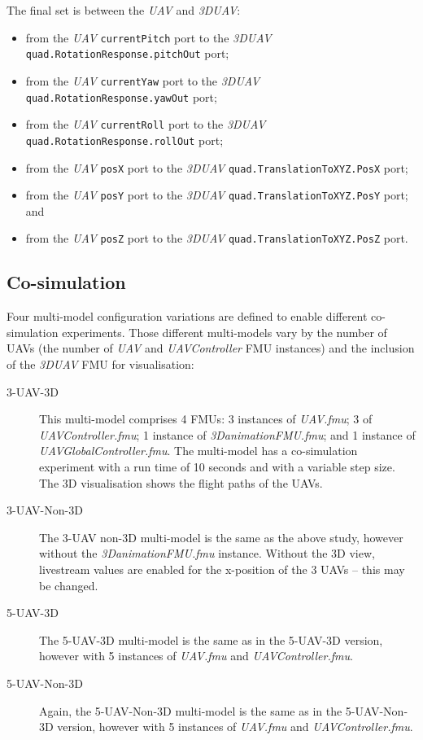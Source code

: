 The final set is between the \emph{UAV} and \emph{3DUAV}:
 \begin{itemize}
  \item from the \emph{UAV} \texttt{currentPitch} port to the \emph{3DUAV} \texttt{quad.RotationResponse.pitchOut} port;
  \item from the \emph{UAV} \texttt{currentYaw} port to the \emph{3DUAV} \texttt{quad.RotationResponse.yawOut} port;
  \item from the \emph{UAV} \texttt{currentRoll} port to the \emph{3DUAV} \texttt{quad.RotationResponse.rollOut} port;
  \item from the \emph{UAV} \texttt{posX} port to the \emph{3DUAV} \texttt{quad.TranslationToXYZ.PosX} port;
  \item from the \emph{UAV} \texttt{posY} port to the \emph{3DUAV} \texttt{quad.TranslationToXYZ.PosY} port; and 
  \item from the \emph{UAV} \texttt{posZ} port to the \emph{3DUAV} \texttt{quad.TranslationToXYZ.PosZ} port.
\end{itemize}


\subsection{Co-simulation}
\label{sec:uavswarm_into_co}

Four multi-model configuration variations are defined to enable different co-simulation experiments. Those different multi-models vary by the number of UAVs (the number of \emph{UAV} and \emph{UAVController} FMU instances) and the inclusion of the \emph{3DUAV} FMU for visualisation:

\begin{description}
  \item[3-UAV-3D] This multi-model comprises 4 FMUs: 3 instances of \emph{UAV.fmu}; 3 of \emph{UAVController.fmu}; 1 instance of \emph{3DanimationFMU.fmu}; and 1 instance of \emph{UAVGlobalController.fmu}. The multi-model has a co-simulation experiment with a run time of 10 seconds and with a variable step size. The 3D visualisation shows the flight paths of the UAVs.
  \item[3-UAV-Non-3D] The 3-UAV non-3D multi-model is the same as the above study, however without the  \emph{3DanimationFMU.fmu} instance. Without the 3D view, livestream values are enabled for the x-position of the 3 UAVs -- this may be changed.
  \item[5-UAV-3D] The 5-UAV-3D multi-model is the same as in the 5-UAV-3D version, however with 5 instances of \emph{UAV.fmu} and \emph{UAVController.fmu}. 
  \item[5-UAV-Non-3D] Again,  the 5-UAV-Non-3D multi-model is the same as in the 5-UAV-Non-3D version, however with 5 instances of \emph{UAV.fmu} and \emph{UAVController.fmu}. 
\end{description}

